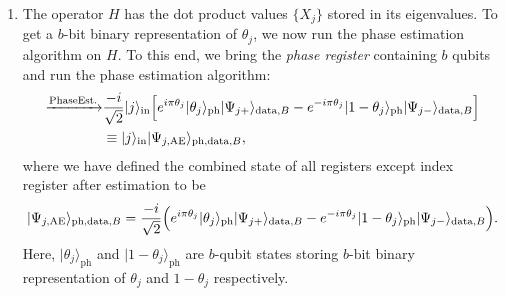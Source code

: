 \documentclass[a4paper,twocolumn,11pt,unpublished]{quantumarticle}
\newcommand{\rang}{\rangle}
\begin{document}
\begin{enumerate}
        
        \item
            The operator $H$ has the dot product values $\{X_j\}$ stored in its eigenvalues. To get a $b$-bit binary representation of $\theta_j$, we now run the phase estimation algorithm on $H$. To this end, we bring the \textit{phase register} containing $b$ qubits and run the phase estimation algorithm:
            \begin{equation}                
                \begin{aligned}
                \xrightarrow{\text{PhaseEst.}}&
                \frac{-i}{\sqrt{2}}  |j\rang_{\text{in}} \Big[
                e^{i\pi \theta_j}|\theta_j\rang_{\text{ph}} |\Psi_{j+}\rang_{\text{data}, B} 
                - e^{-i\pi\theta_j} |1-\theta_j\rang _{\text{ph}}|\Psi_{j-}\rang_{\text{data}, B}\Big]\\
                &\equiv  |j\rang_\text{in} |\Psi_{j,\text{AE}}\rang_{\text{\text{ph,data,}}B}, 
                \end{aligned}        
            \end{equation}
            where we have defined the combined state of all registers except index register after estimation to be
            \begin{equation}
                |\Psi_{j,\text{AE}}\rang_{\text{\text{ph,data,}}B} =
                \frac{-i}{\sqrt{2}}\Big(e^{i\pi \theta_j}|\theta_j\rang_{\text{ph}} |\Psi_{j+}\rang_{\text{data,} B} 
                    - e^{-i\pi\theta_j} |1-\theta_j\rang _{\text{ph} }|\Psi_{j-}\rang_{\text{data}, B}\Big).
            \end{equation}
            Here, $|\theta_j \rang_\text{ph}$ and $|1- \theta_j\rang_\text{ph}$ are $b$-qubit states storing $b$-bit binary representation of $\theta_j$ and $1- \theta_j$ respectively.
                   

\end{enumerate}
\end{document}
